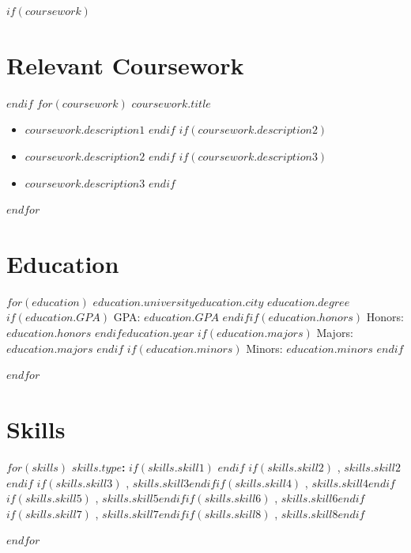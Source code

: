 \documentclass[11pt]{cv-class}
\begin{document}
$if(coursework)$ \section{Relevant Coursework} $endif$
$for(coursework)$
    \noindent\textbf{$coursework.title$}
    \begin{itemize}[noitemsep,nolistsep,leftmargin=*]
        $if(coursework.description1)$ \item \raggedright{$coursework.description1$} $endif$
        $if(coursework.description2)$ \item \raggedright{$coursework.description2$} $endif$
        $if(coursework.description3)$ \item \raggedright{$coursework.description3$} $endif$
    \end{itemize}
    \bigskip
$endfor$

\section{Education}
$for(education)$
    \noindent\textbf{$education.university$}\hfill{$education.city$}\break
    \textit{$education.degree$}\hfill{$if(education.GPA)$ GPA: {$education.GPA$} $endif$}\hfill{$if(education.honors)$ Honors: \textit{$education.honors$} $endif$}\hfill{$education.year$}\break
    {$if(education.majors)$ Majors: {$education.majors$} $endif$}
    {$if(education.minors)$ \split{} Minors: {$education.minors$} $endif$}
    \par
$endfor$
\bigskip

\section{Skills}
$for(skills)$
    \noindent\textbf{$skills.type$: }$if(skills.skill1)$  $endif$ $if(skills.skill2)$ \unskip, {$skills.skill2$} $endif$ $if(skills.skill3)$ \unskip, {$skills.skill3$}$endif$\hfill $if(skills.skill4)$ \unskip, {$skills.skill4$}$endif$\hfill $if(skills.skill5)$ \unskip, {$skills.skill5$}$endif$\hfill $if(skills.skill6)$ \unskip, {$skills.skill6$}$endif$\hfill $if(skills.skill7)$ \unskip, {$skills.skill7$}$endif$\hfill $if(skills.skill8)$ \unskip, {$skills.skill8$}$endif$\hfill \par
$endfor$
\end{document}
